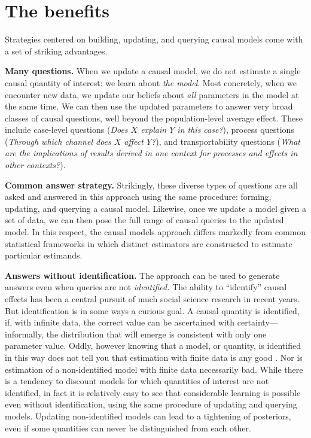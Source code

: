 \documentclass[
  12pt,
]{book}
\begin{document}
\hypertarget{the-benefits}{%
\section{The benefits}\label{the-benefits}}

Strategies centered on building, updating, and querying causal models come with a set of striking advantages.

\textbf{Many questions.} When we update a causal model, we do not estimate a single causal quantity of interest: we learn about \emph{the model}. Most concretely, when we encounter new data, we update our beliefs about \emph{all} parameters in the model at the same time. We can then use the updated parameters to answer very broad classes of causal questions, well beyond the population-level average effect. These include case-level questions (\emph{Does \(X\) explain \(Y\) in this case?}), process questions (\emph{Through which channel does \(X\) affect \(Y\)?}), and transportability questions (\emph{What are the implications of results derived in one context for processes and effects in other contexts?}).

\textbf{Common answer strategy.} Strikingly, these diverse types of questions are all asked and answered in this approach using the same procedure: forming, updating, and querying a causal model. Likewise, once we update a model given a set of data, we can then pose the full range of causal queries to the updated model. In this respect, the causal models approach differs markedly from common statistical frameworks in which distinct estimators are constructed to estimate particular estimands.

\textbf{Answers without identification.} The approach can be used to generate answers even when queries are not \emph{identified.} The ability to ``identify'' causal effects has been a central pursuit of much social science research in recent years. But identification is in some ways a curious goal. A causal quantity is identified, if, with infinite data, the correct value can be ascertained with certainty---informally, the distribution that will emerge is consistent with only one parameter value. Oddly, however knowing that a model, or quantity, is identified in this way does not tell you that estimation with finite data is any good \citep{maclaren2019can}. Nor is estimation of a non-identified model with finite data necessarily bad. While there is a tendency to discount models for which quantities of interest are not identified, in fact it is relatively easy to see that considerable learning is possible even without identification, using the same procedure of updating and querying models. Updating non-identified models can lead to a tightening of posteriors, even if some quantities can never be distinguished from each other.
\end{document}
